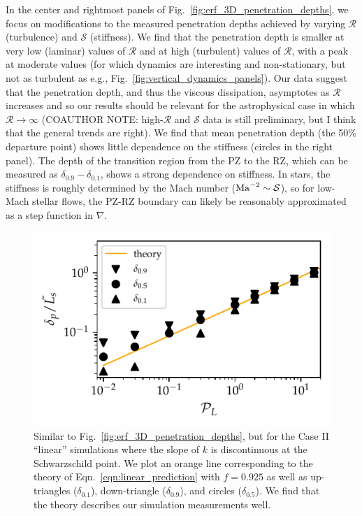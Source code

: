 \documentclass{aastex631}
\newcommand{\justgrad}{\ensuremath{\nabla}}
\newcommand{\mR}{\ensuremath{\mathcal{R}}}
\newcommand{\mS}{\ensuremath{\mathcal{S}}}
\begin{document}
In the center and rightmost panels of Fig.~\ref{fig:erf_3D_penetration_depths}, we focus on modifications to the measured penetration depths achieved by varying $\mR$ (turbulence) and $\mS$ (stiffness).
We find that the penetration depth is smaller at very low (laminar) values of $\mR$ and at high (turbulent) values of $\mR$, with a peak at moderate values (for which dynamics are interesting and non-stationary, but not as turbulent as e.g., Fig.~\ref{fig:vertical_dynamics_panels}).
Our data suggest that the penetration depth, and thus the viscous dissipation, asymptotes as $\mR$ increases and so our results should be relevant for the astrophysical case in which $\mR \rightarrow \infty$ (COAUTHOR NOTE: high-$\mR$ and $\mS$ data is still preliminary, but I think that the general trends are right).
We find that mean penetration depth (the 50\% departure point) shows little dependence on the stiffness (circles in the right panel).
The depth of the transition region from the PZ to the RZ, which can be measured as $\delta_{0.9} - \delta_{0.1}$, shows a strong dependence on stiffness.
In stars, the stiffness is roughly determined by the Mach number ($\rm{Ma}^{-2} \sim \mS$), so for low-Mach stellar flows, the PZ-RZ boundary can likely be reasonably approximated as a step function in $\justgrad$.

\begin{figure}[t!]
\centering
\includegraphics{linear_3D_penetration_depths.pdf}
\caption{
Similar to Fig.~\ref{fig:erf_3D_penetration_depths}, but for the Case II ``linear'' simulations where the slope of $k$ is discontinuous at the Schwarzschild point.
We plot an orange line corresponding to the theory of Eqn.~\ref{eqn:linear_prediction} with $f = 0.925$ as well as up-triangles ($\delta_{0.1}$), down-triangle ($\delta_{0.9}$), and circles ($\delta_{0.5}$).
We find that the theory describes our simulation measurements well.
\label{fig:linear_3D_penetration_depths}
}
\end{figure}
\end{document}
